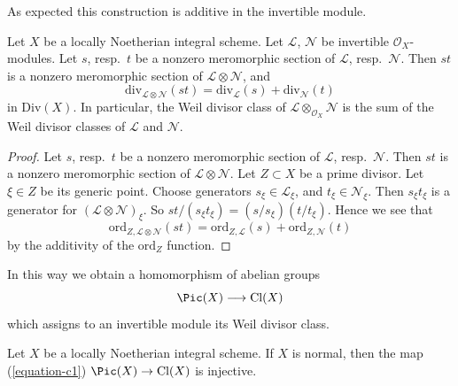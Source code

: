 \noindent
As expected this construction is additive in the invertible module.

\begin{lemma}
\label{lemma-c1-additive}
Let $X$ be a locally Noetherian integral scheme.
Let $\mathcal{L}$, $\mathcal{N}$ be invertible $\mathcal{O}_X$-modules.
Let $s$, resp.\ $t$ be a nonzero meromorphic section
of $\mathcal{L}$, resp.\ $\mathcal{N}$. Then $st$ is a nonzero
meromorphic section of $\mathcal{L} \otimes \mathcal{N}$, and
$$
\text{div}_{\mathcal{L} \otimes \mathcal{N}}(st)
=
\text{div}_\mathcal{L}(s) + \text{div}_\mathcal{N}(t)
$$
in $\text{Div}(X)$. In particular, the Weil divisor class of
$\mathcal{L} \otimes_{\mathcal{O}_X} \mathcal{N}$ is the sum
of the Weil divisor classes of $\mathcal{L}$ and $\mathcal{N}$.
\end{lemma}

\begin{proof}
Let $s$, resp.\ $t$ be a nonzero meromorphic section
of $\mathcal{L}$, resp.\ $\mathcal{N}$. Then $st$ is a nonzero
meromorphic section of $\mathcal{L} \otimes \mathcal{N}$.
Let $Z \subset X$ be a prime divisor. Let $\xi \in Z$ be its generic
point. Choose generators $s_\xi \in \mathcal{L}_\xi$, and
$t_\xi \in \mathcal{N}_\xi$. Then $s_\xi t_\xi$ is a generator
for $(\mathcal{L} \otimes \mathcal{N})_\xi$.
So $st/(s_\xi t_\xi) = (s/s_\xi)(t/t_\xi)$.
Hence we see that
$$
\text{ord}_{Z, \mathcal{L} \otimes \mathcal{N}}(st)
=
\text{ord}_{Z, \mathcal{L}}(s) + \text{ord}_{Z, \mathcal{N}}(t)
$$
by the additivity of the $\text{ord}_Z$ function.
\end{proof}

\noindent
In this way we obtain a homomorphism of abelian groups
\begin{equation}
\label{equation-c1}
\Pic(X) \longrightarrow \text{Cl}(X)
\end{equation}
which assigns to an invertible module its Weil divisor class.

\begin{lemma}
\label{lemma-normal-c1-injective}
Let $X$ be a locally Noetherian integral scheme. If $X$ is normal,
then the map (\ref{equation-c1}) $\Pic(X) \to \text{Cl}(X)$
is injective.
\end{lemma}

